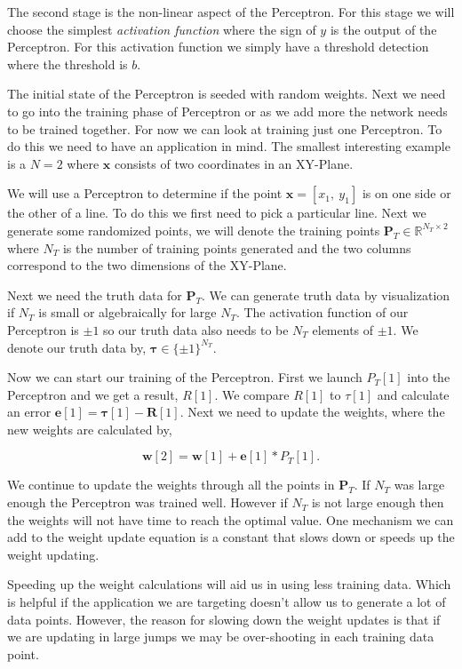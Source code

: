The second stage is the non-linear aspect of the Perceptron. For this stage we will choose the simplest \emph{activation function} where the sign of $y$ is the output of the Perceptron. For this activation function we simply have a threshold detection where the threshold is $b$. 

The initial state of the Perceptron is seeded with random weights. Next we need to go into the training phase of Perceptron or as we add more the network needs to be trained together. For now we can look at training just one Perceptron. To do this we need to have an application in mind. The smallest interesting example is a $N=2$ where $\mathbf{x}$ consists of two coordinates in an XY-Plane. 

We will use a Perceptron to determine if the point $\mathbf{x}=[x_1,~y_1]$ is on one side or the other of a line. To do this we first need to pick a particular line. Next we generate some randomized points, we will denote the training points $\mathbf{P}_T\in \mathbb{R}^{N_T\times 2}$ where $N_T$ is the number of training points generated and the two columns correspond to the two dimensions of the XY-Plane. 

Next we need the truth data for $\mathbf{P}_T$. We can generate truth data by visualization if $N_T$ is small or algebraically for large $N_T$. The activation function of our Perceptron is $\pm1$ so our truth data also needs to be $N_T$ elements of $\pm1$. We denote our truth data by, $\mathbf{\tau}\in \{\pm1\}^{N_T}$. 

Now we can start our training of the Perceptron. First we launch $P_T[1]$ into the Perceptron and we get a result, $R[1]$. We compare $R[1]$ to $\tau[1]$ and calculate an error $\mathbf{e}[1] = \mathbf{\tau}[1]-\mathbf{R}[1]$. Next we need to update the weights, where the new weights are calculated by,

\begin{equation}
\mathbf{w}[2] = \mathbf{w}[1] + \mathbf{e}[1]*P_T[1].
\end{equation}

We continue to update the weights through all the points in $\mathbf{P}_T$. If $N_T$ was large enough the Perceptron was trained well. However if $N_T$ is not large enough then the weights will not have time to reach the optimal value. One mechanism we can add to the weight update equation is a constant that slows down or speeds up the weight updating. 

Speeding up the weight calculations will aid us in using less training data. Which is helpful if the application we are targeting doesn't allow us to generate a lot of data points. However, the reason for slowing down the weight updates is that if we are updating in large jumps we may be over-shooting in each training data point.

